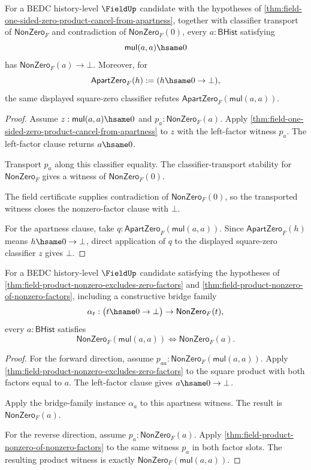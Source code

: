 \begin{theorem}
\label{thm:field-square-zero-rejects-factor-nonzero}
For a BEDC history-level $\FieldUp$ candidate with the hypotheses of
\autoref{thm:field-one-sided-zero-product-cancel-from-apartness}, together
with classifier transport of $\mathsf{NonZero}_F$ and contradiction of
$\mathsf{NonZero}_F(0)$, every $a:\mathsf{BHist}$ satisfying
$$
\mathsf{mul}(a,a)\hsame0
$$
has $\mathsf{NonZero}_F(a)\to\bot$. Moreover, for
$$
\mathsf{ApartZero}_F(h) := (h\hsame0\to\bot),
$$
the same displayed square-zero classifier refutes
$\mathsf{ApartZero}_F(\mathsf{mul}(a,a))$.
\end{theorem}
\begin{proof}
Assume $z:\mathsf{mul}(a,a)\hsame0$ and
$p_a:\mathsf{NonZero}_F(a)$. Apply
\autoref{thm:field-one-sided-zero-product-cancel-from-apartness} to $z$ with
the left-factor witness $p_a$. The left-factor clause returns $a\hsame0$.

Transport $p_a$ along this classifier equality. The classifier-transport
stability for $\mathsf{NonZero}_F$ gives a witness of
$\mathsf{NonZero}_F(0)$.

The field certificate supplies contradiction of $\mathsf{NonZero}_F(0)$, so
the transported witness closes the nonzero-factor clause with $\bot$.

For the apartness clause, take
$q:\mathsf{ApartZero}_F(\mathsf{mul}(a,a))$. Since
$\mathsf{ApartZero}_F(h)$ means $h\hsame0\to\bot$, direct application of $q$
to the displayed square-zero classifier $z$ gives $\bot$.
\end{proof}

\begin{theorem}
\label{thm:field-square-nonzero-iff-factor-nonzero}
For a BEDC history-level $\FieldUp$ candidate satisfying the hypotheses of
\autoref{thm:field-product-nonzero-excludes-zero-factors} and
\autoref{thm:field-product-nonzero-of-nonzero-factors}, including a
constructive bridge family
$$
\alpha_t:\bigl(t\hsame0\to\bot\bigr)\to\mathsf{NonZero}_F(t),
$$
every $a:\mathsf{BHist}$ satisfies
$$
\mathsf{NonZero}_F(\mathsf{mul}(a,a))
\Longleftrightarrow
\mathsf{NonZero}_F(a).
$$
\end{theorem}
\begin{proof}
For the forward direction, assume
$p_{aa}:\mathsf{NonZero}_F(\mathsf{mul}(a,a))$.
Apply \autoref{thm:field-product-nonzero-excludes-zero-factors} to the square
product with both factors equal to $a$. The left-factor clause gives
$a\hsame0\to\bot$.

Apply the bridge-family instance $\alpha_a$ to this apartness witness. The
result is $\mathsf{NonZero}_F(a)$.

For the reverse direction, assume $p_a:\mathsf{NonZero}_F(a)$. Apply
\autoref{thm:field-product-nonzero-of-nonzero-factors} to the same witness
$p_a$ in both factor slots. The resulting product witness is exactly
$\mathsf{NonZero}_F(\mathsf{mul}(a,a))$.
\end{proof}

